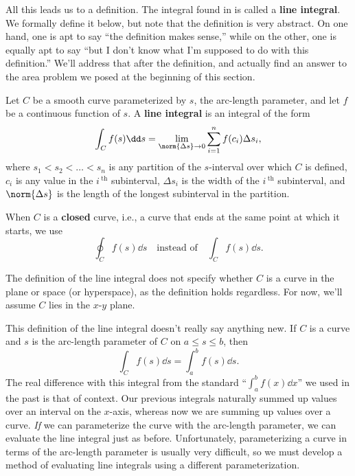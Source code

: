 All this leads us to a definition. The integral found in  is called a \textbf{line integral}. We formally define it below, but note that the definition is very abstract. On one hand, one is apt to say ``the definition makes sense,'' while on the other, one is equally apt to say ``but I don't know what I'm supposed to do with this definition.'' We'll address that after the definition, and actually find an answer to the area problem we posed at the beginning of this section.


\begin{definition}\label{def:line_integral1}
Let $C$ be a smooth curve parameterized by $s$, the arc-length parameter, and let $f$ be a continuous function of $s$. A \textbf{line integral} is an integral of the form
\[\int_C f(s)\dd s = \lim_{\norm{\Delta s}\to 0}\sum_{i=1}^n f(c_i)\Delta s_i,\]
where $s_1<s_2<\dots<s_n$ is any partition of the $s$-interval over which $C$ is defined, $c_i$ is any value in the $i\,^\text{th}$ subinterval,  $\Delta s_i$ is the width of the $i\,^\text{th}$ subinterval, and $\norm{\Delta s}$ is the length of the longest subinterval in the partition.
\end{definition}

When $C$ is a \textbf{closed} curve, i.e., a curve that ends at the same point at which it starts,  we use
\[\oint_C f(s)\dd s \quad \text{instead of}\quad \int_Cf(s)\dd s.\]

The definition of the line integral does not specify whether $C$ is a curve in the plane or space (or hyperspace), as the definition holds regardless. For now, we'll assume $C$ lies in the $x$-$y$ plane.

This definition of the line integral  doesn't really say anything new. If $C$ is a curve and $s$ is the arc-length parameter of $C$ on $a\leq s\leq b$, then 
\[\int_Cf(s)\dd s = \int_a^bf(s)\dd s.\]
The real difference with this integral from the standard ``$\int_a^bf(x)\dd x$'' we used in the past is that of context. Our previous integrals naturally summed up values over an interval on the $x$-axis, whereas now we are summing up values over a curve. \emph{If} we can parameterize the curve with the arc-length parameter, we can evaluate the line integral just as before. Unfortunately, parameterizing a curve in terms of the arc-length parameter is usually very difficult, so we must develop a method of evaluating line integrals using a different parameterization.

